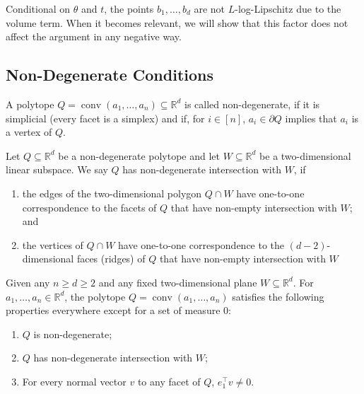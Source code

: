 \documentclass{theoretics}
\newcommand{\R}{\mathbb R}
\newcommand{\T}{\top}
\newcommand{\conv}{\operatorname{conv}}
\renewcommand{\subset}{\subseteq}
\begin{document}
Conditional on $\theta$ and $t$, the points $b_1,\dots,b_d$ are not $L$-log-Lipschitz due to the volume term.
When it becomes relevant, we will show that this factor does not affect the argument in any negative way.

\subsection{Non-Degenerate Conditions}

\begin{definition}\label{def:non-degeneracy}
    A polytope $Q = \conv(a_1,\dots,a_n) \subset \R^d$ is called non-degenerate, if it is simplicial (every facet is a simplex) and if, for $i \in [n]$,
    $a_i \in \partial Q$ implies that $a_i$ is a vertex of $Q$.
\end{definition}

\begin{definition}\label{def:non-degenerate-intersection}
    Let $Q \subset \R^d$ be a non-degenerate polytope and let $W \subset \R^d$ be a two-dimensional linear subspace.
    We say $Q$ has non-degenerate intersection with $W$, if 
    \begin{enumerate}
        \item the edges of the two-dimensional polygon $Q \cap W$ have one-to-one correspondence to the facets of $Q$ that have non-empty intersection with $W$; and
        \item the vertices of $Q \cap W$ have one-to-one correspondence to the $(d-2)$-dimensional faces (ridges) of $Q$ that have non-empty intersection with $W$
    \end{enumerate}
\end{definition}

\begin{fact}\label{lem:non-degeneracy}
    Given any $n \geq d \geq 2$ and any fixed two-dimensional plane $W \subset \R^d$.
    For $a_1, \ldots, a_n \in \R^d$,
    the polytope $Q = \conv(a_1, \ldots, a_n)$ satisfies the following properties
    everywhere except for a set of measure $0$:
    \begin{enumerate}
        \item $Q$ is non-degenerate;
        \item $Q$ has non-degenerate intersection with $W$;
        \item For every normal vector $v$ to any facet of $Q$, $e_1^\T v \neq 0$.
    \end{enumerate}
\end{fact}
\end{document}
